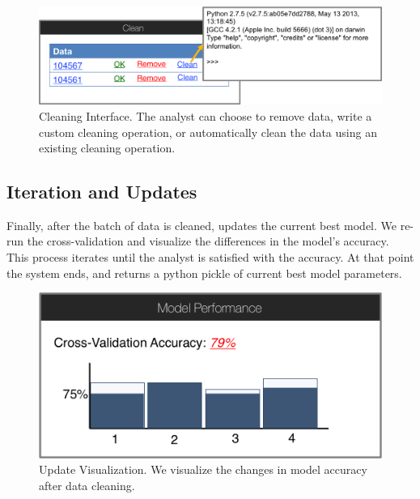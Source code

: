 \begin{figure}[t]
\centering
 \includegraphics[width=\columnwidth]{figs/interface4.png}
 \caption{Cleaning Interface. The analyst can choose to remove data,  write a custom cleaning operation, or automatically clean the data using an existing cleaning operation.}
\end{figure}

\subsection{Iteration and Updates}
Finally, after the batch of data is cleaned, \sys updates the current best model.
We re-run the cross-validation and visualize the differences in the model's accuracy.
This process iterates until the analyst is satisfied with the accuracy.
At that point the system ends, and returns a python pickle of current best model parameters.

\begin{figure}[t]
\centering
 \includegraphics[width=0.6\columnwidth]{figs/interface5.png}
 \caption{Update Visualization. We visualize the changes in model accuracy after data cleaning.}
\end{figure}